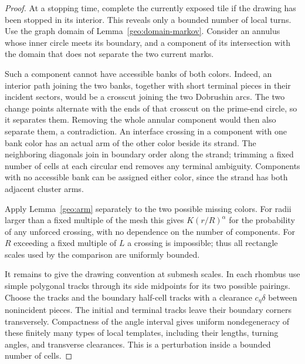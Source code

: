 \begin{proof}
At a stopping time, complete the currently exposed tile if the drawing
has been stopped in its interior. This reveals only a bounded number
of local turns. Use the graph domain of
Lemma~\ref{geo:domain-markov}. Consider an annulus whose inner circle
meets its boundary, and a component of its intersection with the domain
that does not separate the two current marks.

Such a component cannot have accessible banks of both colors. Indeed,
an interior path joining the two banks, together with short terminal
pieces in their incident sectors, would be a crosscut joining the two
Dobrushin arcs. The two change points alternate with the ends of that
crosscut on the prime-end circle, so it separates them. Removing the
whole annular component would then also separate them, a contradiction.
An interface crossing in a component with one bank color has an actual
arm of the other color beside its strand. The neighboring diagonals
join in boundary order along the strand; trimming a fixed number of
cells at each circular end removes any terminal ambiguity. Components
with no accessible bank can be assigned either color, since the strand
has both adjacent cluster arms.

Apply Lemma~\ref{geo:arm} separately to the two possible missing colors.
For radii larger than a fixed multiple of the mesh this gives
\(K(r/R)^\alpha\) for the probability of any unforced crossing, with
no dependence on the number of components. For \(R\) exceeding a fixed
multiple of \(L\) a crossing is impossible; thus all rectangle scales
used by the comparison are uniformly bounded.

It remains to give the drawing convention at submesh scales. In each
rhombus use simple polygonal tracks through its side midpoints for its
two possible pairings. Choose the tracks and the boundary half-cell
tracks with a clearance \(c_\eta\delta\) between nonincident pieces.
The initial and terminal tracks leave their boundary corners
transversely. Compactness of the angle interval gives uniform
nondegeneracy of these finitely many types of local templates,
including their lengths, turning angles, and transverse clearances.
This is a perturbation inside a bounded number of cells.


\end{proof}
